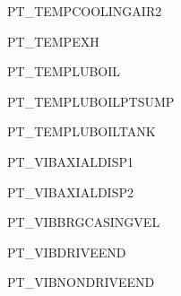\documentclass[runningheads]{llncs}
\begin{document}
\begin{multicols}{3}
\begin{enumerate}
{			\item PT\_TEMPCOOLINGAIR2
			\item PT\_TEMPEXH
			\item PT\_TEMPLUBOIL
			\item PT\_TEMPLUBOILPTSUMP
			\item PT\_TEMPLUBOILTANK
			\item PT\_VIBAXIALDISP1
			\item PT\_VIBAXIALDISP2
			\item PT\_VIBBRGCASINGVEL
			\item PT\_VIBDRIVEEND
			\item PT\_VIBNONDRIVEEND
		}
	\end{enumerate}
\end{multicols}
\end{document}
